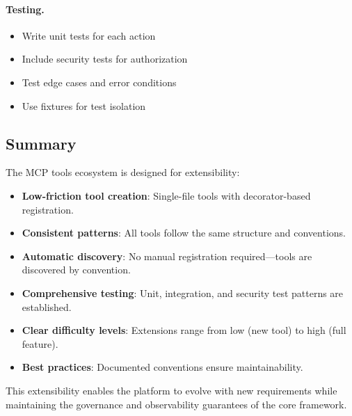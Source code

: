 \paragraph{Testing.}
\begin{itemize}
    \item Write unit tests for each action
    \item Include security tests for authorization
    \item Test edge cases and error conditions
    \item Use fixtures for test isolation
\end{itemize}

\subsection{Summary}
\label{subsec:extension-summary}

The MCP tools ecosystem is designed for extensibility:

\begin{itemize}
    \item \textbf{Low-friction tool creation}: Single-file tools with decorator-based registration.
    \item \textbf{Consistent patterns}: All tools follow the same structure and conventions.
    \item \textbf{Automatic discovery}: No manual registration required---tools are discovered by convention.
    \item \textbf{Comprehensive testing}: Unit, integration, and security test patterns are established.
    \item \textbf{Clear difficulty levels}: Extensions range from low (new tool) to high (full feature).
    \item \textbf{Best practices}: Documented conventions ensure maintainability.
\end{itemize}

This extensibility enables the platform to evolve with new requirements while maintaining the governance and observability guarantees of the core framework.
